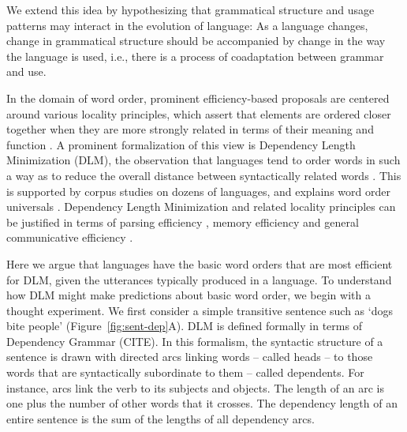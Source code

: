 \documentclass[11pt,a4paper]{article}
\begin{document}

We extend this idea by hypothesizing that grammatical structure and usage patterns may interact in the evolution of language:
As a language changes, change in grammatical structure should be accompanied by change in the way the language is used, i.e., there is a process of {coadaptation} between grammar and use.

In the domain of word order, prominent efficiency-based proposals are centered around various locality principles, which assert that elements are ordered closer together when they are more strongly related in terms of their meaning and function \citep{behaghel1932deutsche,givon1985iconicity,rijkhoff-word-1986,hawkins-performance-1994}.
A prominent formalization of this view is Dependency Length Minimization (DLM), the observation that languages tend to order words in such a way as to reduce the overall distance between syntactically related words \citep{rijkhoff-word-1986,hawkins-performance-1994,liu2008dependency,futrell-cross-linguistic-2015, liu-dependency-2017}.
This is supported by corpus studies on dozens of languages, and explains word order universals \citep{rijkhoff-word-1986, hawkins-performance-1994, hahn2020universals}.
Dependency Length Minimization and related locality principles can be justified in terms of parsing efficiency \citep{hawkins-performance-1994}, memory efficiency \citep{gibson-linguistic-1998} and general communicative efficiency \citep{hahn2020universals}.

Here we argue that languages have the basic word orders that are most efficient for DLM, given the utterances typically produced in a language.
To understand how DLM might make predictions about basic word order, we begin with a thought experiment.
We first consider a simple transitive sentence such as `dogs bite people' (Figure~\ref{fig:sent-dep}A). 
DLM is defined formally in terms of Dependency Grammar (CITE).
In this formalism, the syntactic structure of a sentence is drawn with directed arcs linking words -- called heads -- to those words that are syntactically subordinate to them -- called dependents.
For instance, arcs link the verb to its subjects and objects.
The length of an arc is one plus the number of other words that it crosses.
The dependency length of an entire sentence is the sum of the lengths of all dependency arcs.
\end{document}
